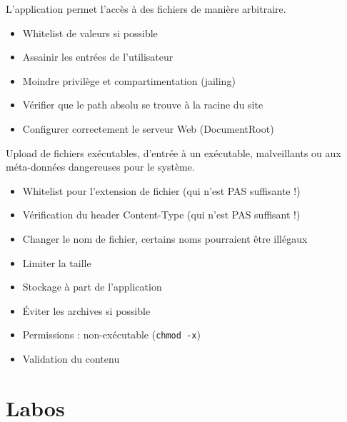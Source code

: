 \documentclass[a4paper]{article}
\begin{document}
\begin{attaque}
    L’application permet l’accès à des fichiers de manière arbitraire.
    \begin{itemize}
        \item Whitelist de valeurs si possible
        \item Assainir les entrées de l’utilisateur
        \item Moindre privilège et compartimentation (jailing)
        \item Vérifier que le path absolu se trouve à la racine du site
        \item Configurer correctement le serveur Web (DocumentRoot)
    \end{itemize}
\end{attaque}

\begin{attaque}
    Upload de fichiers exécutables, d’entrée à un exécutable, malveillants ou
    aux méta-données dangereuses pour le système.
    \begin{itemize}
        \item Whitelist pour l’extension de fichier (qui n’est PAS suffisante !)
        \item Vérification du header Content-Type (qui n’est PAS suffisant !)
        \item Changer le nom de fichier, certains noms pourraient être illégaux
        \item Limiter la taille
        \item Stockage à part de l’application
        \item Éviter les archives si possible
        \item Permissions : non-exécutable (\texttt{chmod -x})
        \item Validation du contenu
    \end{itemize}
\end{attaque}




















\newpage \part{Labos}
\end{document}
